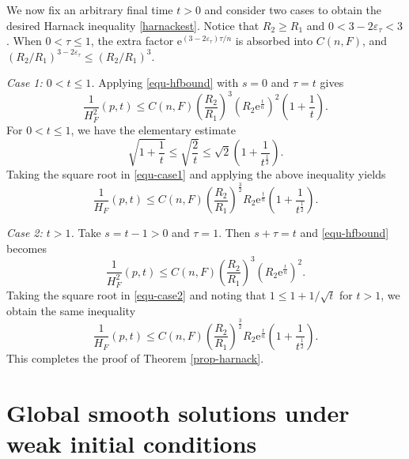 \documentclass[10pt,a4paper]{amsart}
\numberwithin{equation}{section}
\begin{document}
		
		We now fix an arbitrary final time $t>0$ and consider two cases to obtain the desired Harnack inequality \eqref{harnackest}. Notice that $R_2\geq R_1$ and $0<3-2\varepsilon_\tau<3$. When $0<\tau\leq1$, the extra factor $\mathrm e^{(3-2\varepsilon_\tau)\tau/n}$ is absorbed into $C(n,F)$, and $(R_2/R_1)^{3-2\varepsilon_\tau}\leq(R_2/R_1)^3$.
		
		\textit{Case 1: $0<t\leq 1$.} Applying \eqref{equ-hfbound} with $s=0$ and $\tau=t$ gives
		\begin{equation}
			\dfrac{1}{H_F^2}(p,t)\leq C(n,F)\left(\dfrac{R_2}{R_1}\right)^{3}\left( R_2 \mathrm{e}^{\frac{t}{n}} \right)^2 \left( 1+\dfrac{1}{t} \right).
			\label{equ-case1}
		\end{equation}
		For $0 < t \leq 1$, we have the elementary estimate
		\begin{equation*}
			\sqrt{1+ \dfrac{1}{t}} \leq \sqrt{\dfrac{2}{t}} \leq \sqrt{2}\left( 1 + \dfrac{1}{t^{\frac{1}{2}}} \right).
		\end{equation*}
		Taking the square root in \eqref{equ-case1} and applying the above inequality yields
		\begin{equation*}
			\frac{1}{H_F}(p,t)\leq C(n,F)\left(\frac{R_2}{R_1}\right)^{\frac{3}{2}} R_2\mathrm{e}^{\frac{t}{n}}\left(1+\frac{1}{t^{\frac{1}{2}}}\right).
		\end{equation*}
		
		\textit{Case 2: $t>1$.} Take $s=t-1>0$ and $\tau=1$. Then $s+\tau=t$ and \eqref{equ-hfbound} becomes
		\begin{equation}
			\dfrac{1}{H_F^2}(p,t)\leq C(n,F)\left(\dfrac{R_2}{R_1}\right)^{3}\left( R_2 \mathrm{e}^{\frac{t}{n}} \right)^2.
			\label{equ-case2}
		\end{equation}
		Taking the square root in \eqref{equ-case2} and noting that $1 \leq 1 + 1/\sqrt{t}$ for $t > 1$, we obtain the same inequality
		\begin{equation*}
			\frac{1}{H_F}(p,t)\leq C(n,F)\left(\frac{R_2}{R_1}\right)^{\frac{3}{2}} R_2\mathrm{e}^{\frac{t}{n}}\left(1+\frac{1}{t^{\frac{1}{2}}}\right).
		\end{equation*}
		This completes the proof of Theorem \ref{prop-harnack}.

	
	
	\section{Global smooth solutions under weak initial conditions}
	\label{sec4}
	
\end{document}
